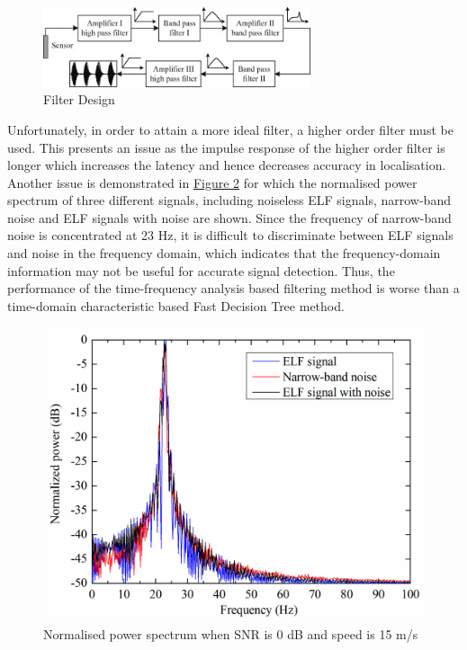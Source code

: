 \documentclass[11pt]{article}		%
\newlength{\imageheight}	 %
\newcommand{\figref}[1]{\hyperref[#1]{Figure \ref*{#1}}}    %
\begin{document}
	        \begin{figure}[h]
				\centering
				\includegraphics[width = 0.7\textwidth]{Filtering.jpg}
				\caption{Filter Design} %
				\label{filterDesign}
			\end{figure}
			
			Unfortunately, in order to attain a more ideal filter, a higher order filter must be used.
			This presents an issue as the impulse response of the higher order filter is longer which increases the latency and hence decreases accuracy in localisation. 
			Another issue is demonstrated in \figref{SNRPower} for which the normalised power spectrum of three different signals, including noiseless ELF signals, narrow-band noise and ELF signals with noise are shown. 
			Since the frequency of narrow-band noise is concentrated at 23 Hz, it is difficult to discriminate between ELF signals and noise in the frequency domain, which indicates that the frequency-domain information may not be useful for accurate signal detection. 
			Thus, the performance of the time-frequency analysis based filtering method is worse than a time-domain characteristic based Fast Decision Tree method.
	
	         \begin{figure}[h]
				\centering
				\includegraphics[height=\imageheight]{SNRPower}
				\caption{Normalised power spectrum when SNR is 0 dB and speed is 15 m/s}
				\label{SNRPower}
			\end{figure}
		    
\end{document}
